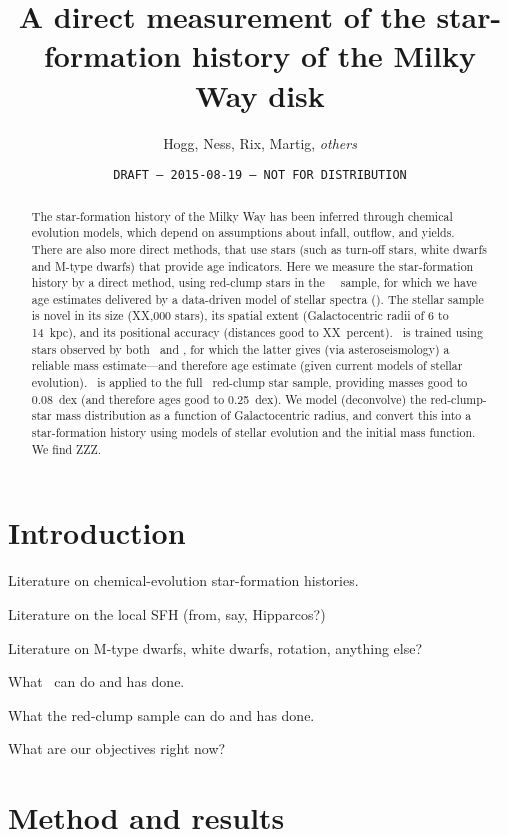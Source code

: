 \documentclass[12pt, preprint]{aastex}
\begin{document}
\title{A direct measurement of the star-formation history of the Milky Way disk}
\author{%
  Hogg,
  Ness,
  Rix,
  Martig,
  \emph{others}}
\date{\texttt{DRAFT --- 2015-08-19 --- NOT FOR DISTRIBUTION}}

\begin{abstract}
The star-formation history of the Milky Way has been inferred
through chemical evolution models, which depend on assumptions about
infall, outflow, and yields.
There are also more direct methods, that use stars (such as turn-off
stars, white dwarfs and M-type dwarfs) that provide age indicators.
Here we measure the star-formation history by a direct method, using
red-clump stars in the \sdss\ \apogee\ sample, for which we have age
estimates delivered by a data-driven model of stellar spectra (\tc).
The stellar sample is novel in its size (XX,000 stars), its spatial
extent (Galactocentric radii of 6 to 14~kpc), and its positional
accuracy (distances good to XX~percent).
\tc\ is trained using stars observed by both \apogee\ and \kepler, for
which the latter gives (via asteroseismology) a reliable mass
estimate---and therefore age estimate (given current models of stellar
evolution).
\tc\ is applied to the full \apogee\ red-clump star sample, providing
masses good to 0.08~dex (and therefore ages good to 0.25~dex).
We model (deconvolve) the red-clump-star mass distribution as a function
of Galactocentric radius, and convert this into a star-formation history
using models of stellar evolution and the initial mass function.
We find ZZZ.
\end{abstract}

\section{Introduction}

Literature on chemical-evolution star-formation histories.

Literature on the local SFH (from, say, Hipparcos?)

Literature on M-type dwarfs, white dwarfs, rotation, anything else?

What \tc\ can do and has done.

What the red-clump sample can do and has done.

What are our objectives right now?

\section{Method and results}
\end{document}
